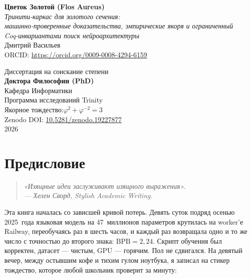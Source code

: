 \documentclass[12pt,a4paper,openany,oneside]{book}
\theoremstyle{plain}
\theoremstyle{definition}
\theoremstyle{remark}
\begin{document}
\frontmatter
\begin{titlepage}
\thispagestyle{empty}
\begin{center}
\vspace*{0.5cm}
{\LARGE\bfseries Цветок Золотой (Flos Aureus)}\\[0.3cm]
{\large\itshape Тринити-каркас для золотого сечения:\\
машинно-проверенные доказательства, эмпирические якоря и ограниченный\\
Coq-инвариантами поиск нейроархитектуры}\\[0.6cm]

{\large Дмитрий Васильев}\\[0.2cm]
{\small ORCID: \url{https://orcid.org/0009-0008-4294-6159}}\\[0.5cm]

\vfill

{\large Диссертация на соискание степени\\[0.2cm]
\textbf{Доктора Философии (PhD)}}\\[0.6cm]

{\normalsize Кафедра Информатики}\\[0.1cm]
{\normalsize Программа исследований Trinity}\\[0.5cm]

{\small Якорное тождество:\quad $\varphi^{2} + \varphi^{-2} = 3$}\\[0.15cm]
{\footnotesize Zenodo DOI: \href{https://doi.org/10.5281/zenodo.19227877}{10.5281/zenodo.19227877}}\\[0.4cm]

{\small 2026}
\end{center}
\end{titlepage}

\chapter*{Предисловие}
\thispagestyle{plain}

\begin{quote}
\itshape
«Изящные идеи заслуживают изящного выражения».\\
\hfill --- Хелен Сворд, \emph{Stylish Academic Writing}.
\end{quote}

\bigskip

\noindent
Эта книга началась со зависшей кривой потерь. Девять суток подряд осенью
2025~года языковая модель на 47~миллионов параметров крутилась на
worker'е Railway, переобучаясь раз в шесть часов, и каждый раз
возвращала одно и то же число с точностью до второго знака:
\(\mathrm{BPB} = 2{,}24\). Скрипт обучения был корректен, датасет --- чистым,
GPU --- горячим. Пол не сдвигался. На девятый вечер, между остывшим кофе
и тихим гулом ноутбука, я записал на стикер тождество, которое любой
школьник проверит за минуту:
\end{document}
